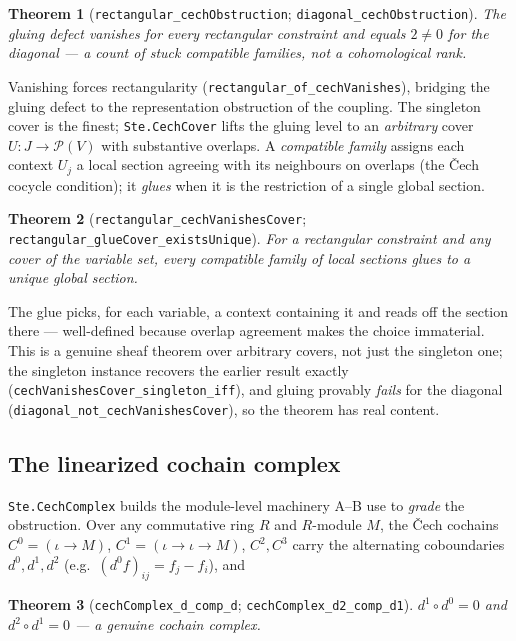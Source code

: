 \documentclass[11pt]{article}
\newtheorem{theorem}{Theorem}
\newcommand{\lean}[1]{\texttt{#1}}
\begin{document}
\begin{theorem}[\lean{rectangular\_cechObstruction};
\lean{diagonal\_cechObstruction}]
The gluing defect vanishes for every rectangular constraint and equals
$2 \ne 0$ for the diagonal --- a count of stuck compatible families, not
a cohomological rank.
\end{theorem}

\noindent Vanishing forces rectangularity
(\lean{rectangular\_of\_cechVanishes}), bridging the gluing defect to
the representation obstruction of the coupling.
The singleton cover is the finest; \lean{Ste.CechCover} lifts the
gluing level to an \emph{arbitrary} cover $U : J \to \mathcal{P}(V)$
with substantive overlaps.  A \emph{compatible family} assigns each
context $U_j$ a local section agreeing with its neighbours on overlaps
(the Čech cocycle condition); it \emph{glues} when it is the restriction
of a single global section.

\begin{theorem}[\lean{rectangular\_cechVanishesCover};
\lean{rectangular\_glueCover\_existsUnique}]
For a rectangular constraint and \emph{any} cover of the variable set,
every compatible family of local sections glues to a \emph{unique}
global section.
\end{theorem}

\noindent The glue picks, for each variable, a context containing it and
reads off the section there --- well-defined because overlap agreement
makes the choice immaterial.  This is a genuine sheaf theorem over
arbitrary covers, not just the singleton one; the singleton instance
recovers the earlier result exactly
(\lean{cechVanishesCover\_singleton\_iff}), and gluing provably
\emph{fails} for the diagonal (\lean{diagonal\_not\_cechVanishesCover}),
so the theorem has real content.

\subsection{The linearized cochain complex}
\lean{Ste.CechComplex} builds the module-level machinery
A--B use to \emph{grade} the obstruction.  Over any commutative ring $R$
and $R$-module $M$, the Čech cochains $C^0 = (\iota \to M)$,
$C^1 = (\iota \to \iota \to M)$, $C^2, C^3$ carry the alternating
coboundaries $d^0, d^1, d^2$ (e.g.\ $(d^0 f)_{ij} = f_j - f_i$), and

\begin{theorem}[\lean{cechComplex\_d\_comp\_d};
\lean{cechComplex\_d2\_comp\_d1}]
$d^1 \circ d^0 = 0$ and $d^2 \circ d^1 = 0$ --- a genuine cochain complex.
\end{theorem}
\end{document}
